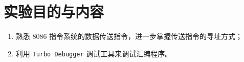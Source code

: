 \documentclass[fontset=windows,11pt]{SEU-Digital-Report}
\begin{document}
\exptitlepage

\tableofcontents
\newpage

\section{实验目的与内容}       
\begin{enumerate}
    \item 熟悉 8086 指令系统的数据传送指令，进一步掌握传送指令的寻址方式；
    \item 利用 \texttt{Turbo Debugger} 调试工具来调试汇编程序。   
\end{enumerate}














\printbibliography
\end{document}

